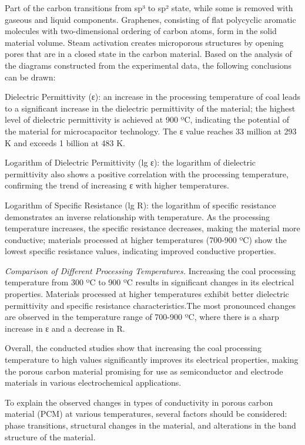 \begin{multicols}{2}
Part of the carbon transitions from sp³ to sp² state, while some is
removed with gaseous and liquid components. Graphenes, consisting of
flat polycyclic aromatic molecules with two-dimensional ordering of
carbon atoms, form in the solid material volume. Steam activation
creates microporous structures by opening pores that are in a closed
state in the carbon material. Based on the analysis of the diagrams
constructed from the experimental data, the following conclusions can be
drawn:

Dielectric Permittivity (ε): an increase in the processing temperature
of coal leads to a significant increase in the dielectric permittivity
of the material; the highest level of dielectric permittivity is
achieved at 900 ºC, indicating the potential of the material for
microcapacitor technology. The ε value reaches 33 million at 293 K and
exceeds 1 billion at 483 K.

Logarithm of Dielectric Permittivity (lg ε): the logarithm of dielectric
permittivity also shows a positive correlation with the processing
temperature, confirming the trend of increasing ε with higher
temperatures.

Logarithm of Specific Resistance (lg R): the logarithm of specific
resistance demonstrates an inverse relationship with temperature. As the
processing temperature increases, the specific resistance decreases,
making the material more conductive; materials processed at higher
temperatures (700-900 ºC) show the lowest specific resistance values,
indicating improved conductive properties.

\emph{Comparison of Different Processing Temperatures.} Increasing the
coal processing temperature from 300 ºC to 900 ºC results in significant
changes in its electrical properties. Materials processed at higher
temperatures exhibit better dielectric permittivity and specific
resistance characteristics.The most pronounced changes are observed in
the temperature range of 700-900 ºC, where there is a sharp increase in
ε and a decrease in R.

Overall, the conducted studies show that increasing the coal processing
temperature to high values significantly improves its electrical
properties, making the porous carbon material promising for use as
semiconductor and electrode materials in various electrochemical
applications.

To explain the observed changes in types of conductivity in porous
carbon material (PCM) at various temperatures, several factors should be
considered: phase transitions, structural changes in the material, and
alterations in the band structure of the material.


\end{multicols}
